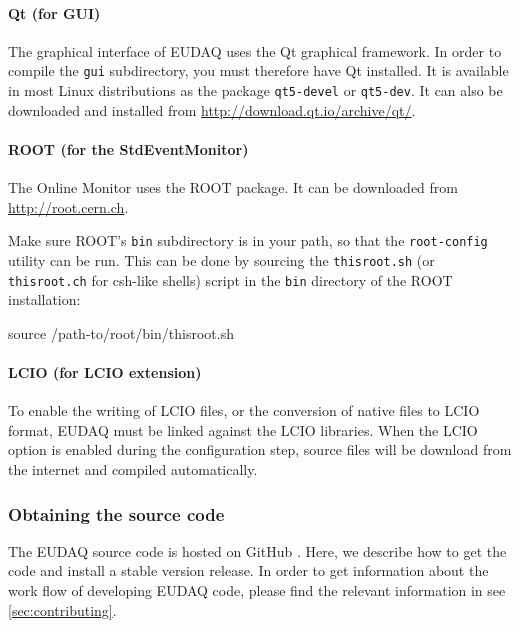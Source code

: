 \paragraph{Qt (for GUI)}
The graphical interface of EUDAQ uses the Qt graphical framework.
In order to compile the \texttt{gui} subdirectory, you must therefore have Qt installed.
It is available in most Linux distributions as the package \texttt{qt5-devel} or \texttt{qt5-dev}.
It can also be downloaded and installed from \url{http://download.qt.io/archive/qt/}. 

\paragraph{ROOT (for the StdEventMonitor)}
\label{sec:Root}
The Online Monitor uses the ROOT package.
It can be downloaded from \url{http://root.cern.ch}.

Make sure ROOT's \texttt{bin} subdirectory is in your path, so that the \texttt{root-config} utility can be run.
This can be done by sourcing the \texttt{thisroot.sh} (or \texttt{thisroot.ch} for csh-like shells)
script in the \texttt{bin} directory of the ROOT installation:
\begin{listing}[mybash]
source /path-to/root/bin/thisroot.sh
\end{listing}

\paragraph{LCIO (for LCIO extension)}
\label{sec:LCIO}
To enable the writing of \gls{LCIO} files, or the conversion of native files to \gls{LCIO} format,
EUDAQ must be linked against the \gls{LCIO} libraries.
When the LCIO option is enabled during the configuration step, source files will be download from the internet and compiled automatically.

\subsubsection{Obtaining the source code}
\label{sec:downloadingEUDAQ}

The EUDAQ source code is hosted on GitHub \cite{githubEUDAQ}. 
Here, we describe how to get the code and install a stable version release. 
In order to get information about the work flow of developing EUDAQ code, please find the relevant information in see \autoref{sec:contributing}.

